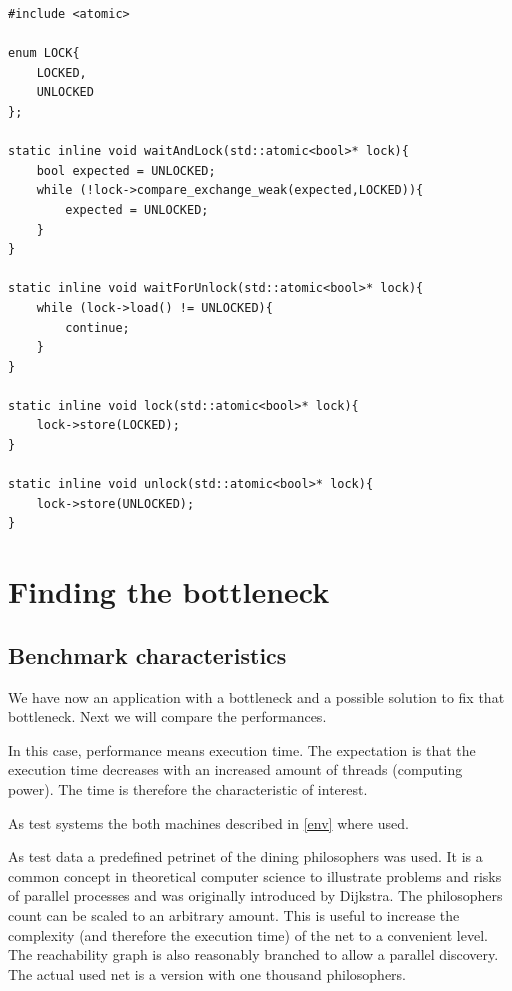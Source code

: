 \begin{lstlisting}
#include <atomic>

enum LOCK{
    LOCKED,
    UNLOCKED
};

static inline void waitAndLock(std::atomic<bool>* lock){
    bool expected = UNLOCKED;
    while (!lock->compare_exchange_weak(expected,LOCKED)){
        expected = UNLOCKED;
    }
}

static inline void waitForUnlock(std::atomic<bool>* lock){
    while (lock->load() != UNLOCKED){
        continue;
    }
}

static inline void lock(std::atomic<bool>* lock){
    lock->store(LOCKED);
}

static inline void unlock(std::atomic<bool>* lock){
    lock->store(UNLOCKED);
}
\end{lstlisting}

\section{Finding the bottleneck}
\subsection{Benchmark characteristics}
We have now an application with a bottleneck and a possible solution to fix that bottleneck. Next we will compare the performances.

In this case, performance means execution time. The expectation is that the execution time decreases with an increased amount of threads (computing power). The time is therefore the characteristic of interest.

As test systems the both machines described in \ref{env} where used.

As test data a predefined petrinet of the dining philosophers was used. It is a common concept in theoretical computer science to illustrate problems and risks of parallel processes and was originally introduced by Dijkstra\cite{dijkstra1971hierarchical}. The philosophers count can be scaled to an arbitrary amount. This is useful to increase the complexity (and therefore the execution time) of the net to a convenient level. The reachability graph is also reasonably branched to allow a parallel discovery. The actual used net is a version with one thousand philosophers.

